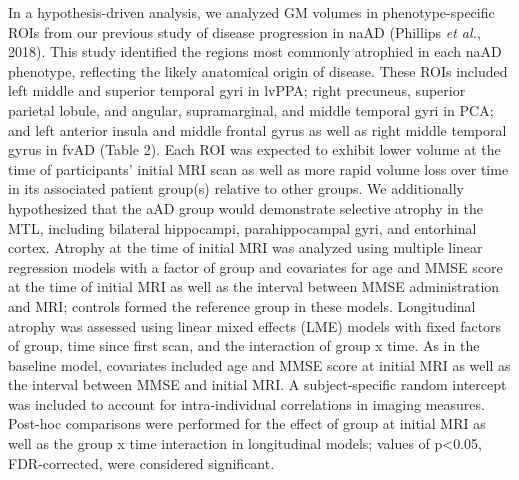 \documentclass[]{article}
\begin{document}
In a hypothesis-driven analysis, we analyzed GM volumes in
phenotype-specific ROIs from our previous study of disease progression
in naAD (Phillips \emph{et al.}, 2018). This study identified the
regions most commonly atrophied in each naAD phenotype, reflecting the
likely anatomical origin of disease. These ROIs included left middle and
superior temporal gyri in lvPPA; right precuneus, superior parietal
lobule, and angular, supramarginal, and middle temporal gyri in PCA; and
left anterior insula and middle frontal gyrus as well as right middle
temporal gyrus in fvAD (Table 2). Each ROI was expected to exhibit lower
volume at the time of participants' initial MRI scan as well as more
rapid volume loss over time in its associated patient group(s) relative
to other groups. We additionally hypothesized that the aAD group would
demonstrate selective atrophy in the MTL, including bilateral
hippocampi, parahippocampal gyri, and entorhinal cortex. Atrophy at the
time of initial MRI was analyzed using multiple linear regression models
with a factor of group and covariates for age and MMSE score at the time
of initial MRI as well as the interval between MMSE administration and
MRI; controls formed the reference group in these models. Longitudinal
atrophy was assessed using linear mixed effects (LME) models with fixed
factors of group, time since first scan, and the interaction of group x
time. As in the baseline model, covariates included age and MMSE score
at initial MRI as well as the interval between MMSE and initial MRI. A
subject-specific random intercept was included to account for
intra-individual correlations in imaging measures. Post-hoc comparisons
were performed for the effect of group at initial MRI as well as the
group x time interaction in longitudinal models; values of
p\textless{}0.05, FDR-corrected, were considered significant.
\end{document}
